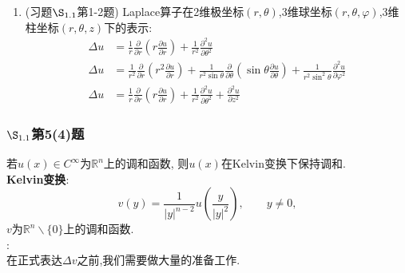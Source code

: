 \documentclass[12pt, a4paper]{ctexart}
\begin{document}
\begin{itemize}
\begin{enumerate}
\begin{enumerate}
            \end{enumerate}
            \item (习题$\S_{1.1}$第1-2题) Laplace算子在2维极坐标$(r, \theta)$,3维球坐标$(r, \theta, \varphi)$,3维柱坐标$(r, \theta, z)$下的表示:
            \begin{align*}
            \Delta u &= \frac1r \frac{\partial}{\partial r}(r\frac{\partial u}{\partial r}) + \frac1{r^2} \frac{\partial^2 u}{\partial \theta^2}\\
            \Delta u &= \frac1{r^2} \frac\partial{\partial r}(r^2\frac{\partial u}{\partial r}) + \frac1{r^2\sin\theta}\frac\partial{\partial \theta}(\sin\theta\frac{\partial u}{\partial\theta}) + \frac1{r^2\sin^2\theta}\frac{\partial^2u}{\partial\varphi^2}\\ 
            \Delta u &= \frac1r \frac\partial{\partial r}(r\frac{\partial u}{\partial r}) + \frac1{r^2}\frac{\partial^2u}{\partial\theta^2} + \frac{\partial^2u}{\partial z^2}
            \end{align*}
            
        
        \end{enumerate}
    
    \end{itemize}
	\subsubsection{$\S_{1.1}$第5(4)题}
	\kaishu{}
	若$u(x)\in C^\infty$为$\mathbb{R}^n$上的调和函数, 则$u(x)$在Kelvin变换下保持调和.\\ 
	{\bf Kelvin变换}:$$v(y) = \frac1{|y|^{n-2}}u\left(\frac{y}{|y|^2}\right),\qquad y\neq0,$$ $v$为$\mathbb{R}^n \backslash\{0\}$上的调和函数.\\
	
	
	\songti{}
	:\\
	
	在正式表达$\Delta v$之前,我们需要做大量的准备工作.
	
\end{document}
